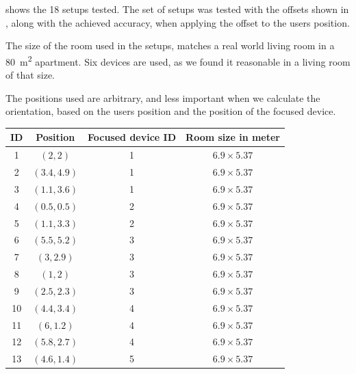  shows the \num{18} setups tested. 
The set of setups was tested with the offsets shown in , 
along with the achieved accuracy, 
when applying the offset to the users position.

The size of the room used in the setups, 
matches a real world living room in a \SI{80}{\square\meter} apartment. 
Six devices are used, 
as we found it reasonable in a living room of that size.

The positions used are arbitrary, 
and less important when we calculate the orientation, 
based on the users position and the position of the focused device.

\begin{table}[!hbt]
\centering
\begin{tabular}{c|ccc}
\textbf{ID} & \textbf{Position} & \textbf{Focused device ID} & \textbf{Room size in meter} \\
\hline
1           & $(2 , 2)$           & 1                          & $6.9 \times 5.37$       \\
2           & $(3.4 , 4.9)$       & 1                          & $6.9 \times 5.37$     \\
3           & $(1.1 , 3.6)$       & 1                          & $6.9 \times 5.37$     \\
4           & $(0.5 , 0.5)$       & 2                          & $6.9 \times 5.37$     \\
5           & $(1.1 , 3.3)$       & 2                          & $6.9 \times 5.37$     \\
6           & $(5.5 , 5.2)$       & 3                          & $6.9 \times 5.37$     \\
7           & $(3 , 2.9)$         & 3                          & $6.9 \times 5.37$     \\
8           & $(1 , 2)$           & 3                          & $6.9 \times 5.37$     \\
9           & $(2.5 , 2.3)$       & 3                          & $6.9 \times 5.37$     \\
10          & $(4.4 , 3.4)$       & 4                          & $6.9 \times 5.37$     \\
11          & $(6 , 1.2)$         & 4                          & $6.9 \times 5.37$     \\
12          & $(5.8 , 2.7)$       & 4                          & $6.9 \times 5.37$     \\
13          & $(4.6 , 1.4)$       & 5                          & $6.9 \times 5.37$     \\

\end{tabular}
\end{table}
